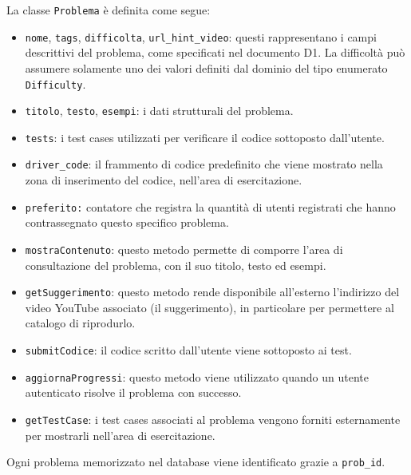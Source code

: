 \documentclass[11pt, a4paper]{article}
\theoremstyle{definition} %
\begin{document}
\noindent La classe \texttt{Problema} è definita come segue:
\begin{itemize}
    \item \texttt{nome}, \texttt{tags}, \texttt{difficolta}, \texttt{url\_hint\_video}:
    questi rappresentano i campi descrittivi del problema, come specificati nel
    documento D1. La difficoltà può assumere solamente uno dei valori
    definiti dal dominio del tipo enumerato \texttt{Difficulty}.

    \item \texttt{titolo}, \texttt{testo}, \texttt{esempi}: i dati strutturali del problema.

    \item \texttt{tests}: i test cases utilizzati per verificare il codice
    sottoposto dall'utente.

    \item \texttt{driver\_code}: il frammento di codice predefinito che
    viene mostrato nella zona di inserimento del codice, nell'area di
    esercitazione.

    \item \texttt{preferito:} contatore che registra la quantità di utenti
    registrati che hanno contrassegnato questo specifico problema.

    \item \texttt{mostraContenuto}: questo metodo permette di comporre
    l'area di consultazione del problema, con il suo titolo, testo ed
    esempi.

    \item \texttt{getSuggerimento}: questo metodo rende disponibile
    all'esterno l'indirizzo del video YouTube associato (il suggerimento),
    in particolare per permettere al catalogo di riprodurlo.

    \item \texttt{submitCodice}: il codice scritto dall'utente viene
    sottoposto ai test.

    \item \texttt{aggiornaProgressi}: questo metodo viene utilizzato
    quando un utente autenticato risolve il problema con successo.

    \item \texttt{getTestCase}: i test cases associati al problema
    vengono forniti esternamente per mostrarli nell'area di esercitazione.

\end{itemize}
Ogni problema memorizzato nel database viene identificato grazie a
\texttt{prob\_id}.
\\\\
\end{document}
